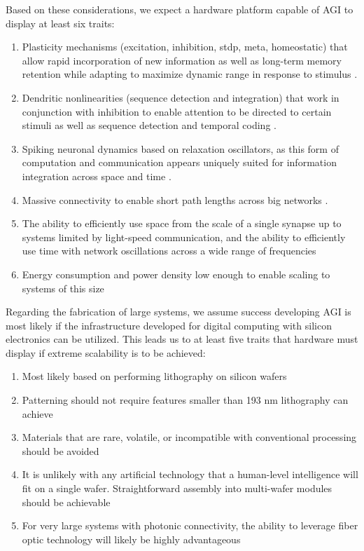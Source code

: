 \documentclass[twocolumn]{article}
\begin{document}
Based on these considerations, we expect a hardware platform capable of AGI to display at least six traits:
\begin{enumerate}
\item Plasticity mechanisms (excitation, inhibition, stdp, meta, homeostatic) that allow rapid incorporation of new information as well as long-term memory retention \cite{fudr2005,fuab2007} while adapting to maximize dynamic range in response to stimulus \cite{shki2006}.
\item Dendritic nonlinearities (sequence detection and integration) that work in conjunction with inhibition to enable attention to be directed to certain stimuli \cite{bu2006} as well as sequence detection \cite{haah2015} and temporal coding \cite{}. 
\item Spiking neuronal dynamics based on relaxation oscillators, as this form of computation and communication appears uniquely suited for information integration across space and time \cite{bu2006}.
\item Massive connectivity to enable short path lengths across big networks \cite{sp2010}.
\item The ability to efficiently use space from the scale of a single synapse up to systems limited by light-speed communication, and the ability to efficiently use time with network oscillations across a wide range of frequencies
\item Energy consumption and power density low enough to enable scaling to systems of this size
\end{enumerate}

Regarding the fabrication of large systems, we assume success developing AGI is most likely if the infrastructure developed for digital computing with silicon electronics can be utilized. This leads us to at least five traits that hardware must display if extreme scalability is to be achieved:
\begin{enumerate}
\item Most likely based on performing lithography on silicon wafers
\item Patterning should not require features smaller than 193 nm lithography can achieve
\item Materials that are rare, volatile, or incompatible with conventional processing should be avoided
\item It is unlikely with any artificial technology that a human-level intelligence will fit on a single wafer. Straightforward assembly into multi-wafer modules should be achievable
\item For very large systems with photonic connectivity, the ability to leverage fiber optic technology will likely be highly advantageous
\end{enumerate}
\end{document}
